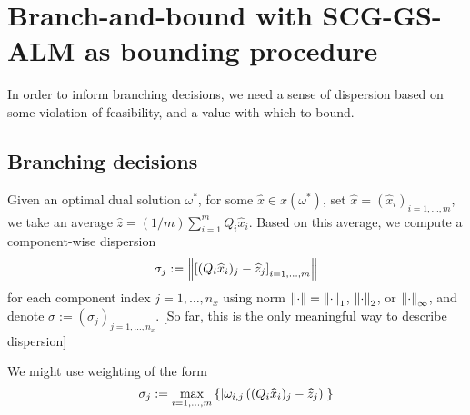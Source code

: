 \section{Branch-and-bound with SCG-GS-ALM as bounding procedure}

In order to inform branching decisions, we need a sense of dispersion based on some violation of feasibility, and a value with which to bound.

\subsection{Branching decisions}
Given an optimal dual solution $\omega^*$, for some $\widehat{x} \in \widehat{x}(\omega^*)$, 
set $\widehat{x}=(\widehat{x}_i)_{i=1,\dots,m}$, we take an average $\widehat{z} = (1/m)\sum_{i=1}^m Q_i\widehat{x}_i$. Based on this average,
we compute a component-wise dispersion 
$$\sigma_j:=\left \|  \left[(Q_i\widehat{x}_{i})_j - \widehat{z}_j\right]_{i=1,\dots,m}  \right \|$$ 
for each component index $j=1,\dots,n_x$ using norm $\left \| \cdot \right \|=\left \| \cdot \right \|_{1}$, $\left \| \cdot \right \|_2$, or $\left \| \cdot \right \|_\infty$, and denote $\sigma:=(\sigma_j)_{j=1,\dots,n_x}$. 
[So far, this is the only meaningful way to describe dispersion]

We might use weighting of the form 
$$\sigma_j:=\max_{i=1,\dots,m} \left\{ \left| \omega_{i,j} \left( (Q_i\widehat{x}_{i})_j - \widehat{z}_j \right) \right| \right \}$$




